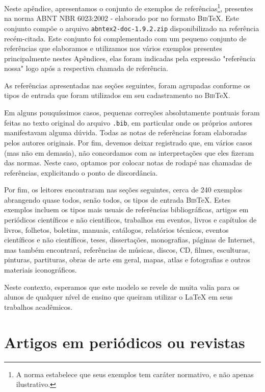 \begin{apendicesenv}
Neste apêndice, apresentamos o conjunto de exemplos de referências\footnote{A norma estabelece que seus exemplos tem caráter normativo, e não apenas ilustrativo.}, presentes na norma ABNT NBR 6023:2002 \cite{NBR6023:2002} - elaborado por   no formato \textsc{Bib}\TeX{}. Este conjunto compõe o arquivo \verb|abntex2-doc-1.9.2.zip| disponibilizado na referência recém-citada. Este conjunto foi complementado com um pequeno conjunto de referências que elaboramos e utilizamos nos vários exemplos presentes principalmente nestes Apêndices, elas foram indicadas pela expressão "referência nossa"{} logo após a respectiva chamada de referência.

As referências apresentadas nas seções seguintes, foram agrupadas conforme os tipos de entrada que foram utilizados em seu cadastramento no \textsc{Bib}\TeX{}.

Em alguns pouquíssimos casos, pequenas correções absolutamente pontuais foram feitas no texto original do arquivo \verb|.bib|, em particular onde os próprios autores manifestavam alguma dúvida. Todas as notas de referências foram elaboradas pelos autores originais. Por fim, devemos deixar registrado que, em vários casos (mas não em demasia), não concordamos com as interpretações que eles fizeram das normas. Neste caso, optamos por colocar notas de rodapé nas chamadas de referências, explicitando o ponto de discordância.

Por fim, os leitores encontraram nas seções seguintes, cerca de 240 exemplos abrangendo quase todos, senão todos, os tipos de entrada \textsc{Bib}\TeX{}. Estes exemplos incluem os tipos mais usuais de referências bibliográficas, artigos em periódicos científicos e não científicos, trabalhos em eventos, livros e capítulos de livros, folhetos, boletins, manuais, catálogos, relatórios técnicos, eventos científicos e não científicos, teses, dissertações, monografias, páginas de Internet, mas também encontrará, referências de músicas, discos, CD, filmes, esculturas, pinturas, partituras, obras de arte em geral, mapas, atlas e fotografias e outros materiais iconográficos.

Neste contexto, esperamos que este modelo se revele de muita valia para os alunos de qualquer nível de ensino que queiram utilizar o \LaTeX{} em seus trabalhos acadêmicos.



\section{Artigos em periódicos ou revistas}
\label{sec:article}


\end{apendicesenv}
